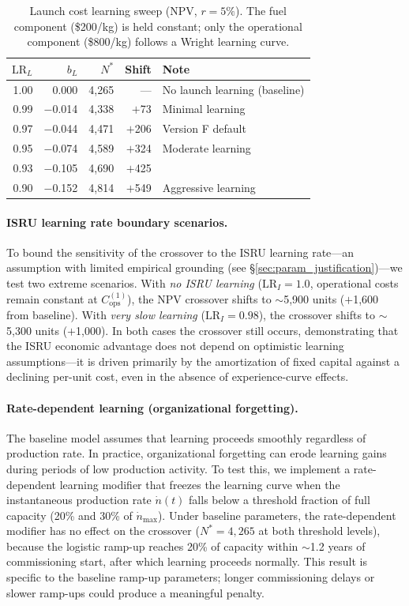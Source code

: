 \documentclass[preprint,12pt]{elsarticle}
\begin{document}
\begin{table}[htbp]
\centering
\caption{Launch cost learning sweep (NPV, $r = 5\%$). The fuel component (\$200/kg) is held constant; only the operational component (\$800/kg) follows a Wright learning curve.}
\label{tab:launch_learning}
\small
\begin{tabular}{@{}rrrrl@{}}
\toprule
$\mathrm{LR}_L$ & $b_L$ & $N^*$ & Shift & Note \\
\midrule
1.00 & 0.000  & 4{,}265 & ---    & No launch learning (baseline) \\
0.99 & $-$0.014 & 4{,}338 & $+$73  & Minimal learning \\
0.97 & $-$0.044 & 4{,}471 & $+$206 & Version F default \\
0.95 & $-$0.074 & 4{,}589 & $+$324 & Moderate learning \\
0.93 & $-$0.105 & 4{,}690 & $+$425 & \\
0.90 & $-$0.152 & 4{,}814 & $+$549 & Aggressive learning \\
\bottomrule
\end{tabular}
\end{table}

\paragraph{ISRU learning rate boundary scenarios.} To bound the sensitivity of the crossover to the ISRU learning rate---an assumption with limited empirical grounding (see \S\ref{sec:param_justification})---we test two extreme scenarios. With \emph{no ISRU learning} ($\mathrm{LR}_I = 1.0$, operational costs remain constant at $C_{\mathrm{ops}}^{(1)}$), the NPV crossover shifts to $\sim$5{,}900 units ($+$1{,}600 from baseline). With \emph{very slow learning} ($\mathrm{LR}_I = 0.98$), the crossover shifts to $\sim$5{,}300 units ($+$1{,}000). In both cases the crossover still occurs, demonstrating that the ISRU economic advantage does not depend on optimistic learning assumptions---it is driven primarily by the amortization of fixed capital against a declining per-unit cost, even in the absence of experience-curve effects.

\paragraph{Rate-dependent learning (organizational forgetting).} The baseline model assumes that learning proceeds smoothly regardless of production rate. In practice, organizational forgetting \cite{benkard2000,thompson2012} can erode learning gains during periods of low production activity. To test this, we implement a rate-dependent learning modifier that freezes the learning curve when the instantaneous production rate $\dot{n}(t)$ falls below a threshold fraction of full capacity (20\% and 30\% of $\dot{n}_{\max}$). Under baseline parameters, the rate-dependent modifier has no effect on the crossover ($N^* = 4{,}265$ at both threshold levels), because the logistic ramp-up reaches 20\% of capacity within $\sim$1.2 years of commissioning start, after which learning proceeds normally. This result is specific to the baseline ramp-up parameters; longer commissioning delays or slower ramp-ups could produce a meaningful penalty.
\end{document}
